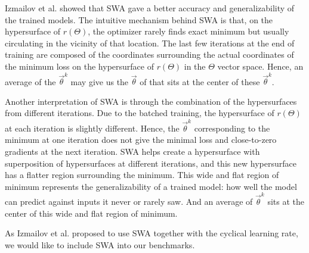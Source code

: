 Izmailov et al. \cite{izmailov_averaging_2019} showed that SWA gave a better accuracy and generalizability of the trained models.
The intuitive mechanism behind SWA is that, on the hypersurface of $r(\Theta)$, the optimizer rarely finds exact minimum but usually circulating in the vicinity of that location.
The last few iterations at the end of training are composed of the coordinates surrounding the actual coordinates of the minimum loss on the hypersurface of $r(\Theta)$ in the $\Theta$ vector space.
Hence, an average of the $\vec{\theta}^k$ may give us the $\vec{\theta}$ of that sits at the center of these $\vec{\theta}^k$.

Another interpretation of SWA is through the combination of the hypersurfaces from different iterations.
Due to the batched training, the hypersurface of $r(\Theta)$ at each iteration is slightly different.
Hence, the $\vec{\theta}^k$ corresponding to the minimum at one iteration does not give the minimal loss and close-to-zero gradients at the next iteration.
SWA helps create a hypersurface with superposition of hypersurfaces at different iterations, and this new hypersurface has a flatter region surrounding the minimum.
This wide and flat region of minimum represents the generalizability of a trained model: how well the model can predict against inputs it never or rarely saw.
And an average of $\vec{\theta}^k$ sits at the center of this wide and flat region of minimum.

As Izmailov et al. proposed to use SWA together with the cyclical learning rate, we would like to include SWA into our benchmarks.